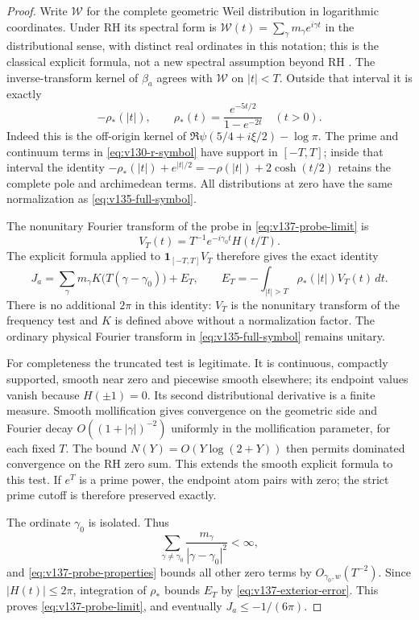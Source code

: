 \documentclass[11pt]{article}
\theoremstyle{remark}
\begin{document}
\begin{proof}
Write $\mathcal W$ for the complete geometric Weil distribution in
logarithmic coordinates. Under RH its spectral form is
$\mathcal W(t)=\sum_\gamma m_\gamma e^{i\gamma t}$ in the distributional
sense, with distinct real ordinates in this notation; this is the
classical explicit formula, not a new spectral assumption beyond RH
\cite[Theorem 2.1]{BurnolExplicit2000}.
The inverse-transform kernel of $\beta_a$ agrees with $\mathcal W$
on $|t|<T$. Outside that interval it is exactly
\[
 -\rho_*(|t|),\qquad
 \rho_*(t)=\frac{e^{-5t/2}}{1-e^{-2t}}\quad(t>0).
\]
Indeed this is the off-origin kernel of
$\Re\psi(5/4+i\xi/2)-\log\pi$. The prime and continuum terms in
\eqref{eq:v130-r-symbol} have support in $[-T,T]$; inside that interval
the identity
$-\rho_*(|t|)+e^{|t|/2}=-\rho(|t|)+2\cosh(t/2)$
retains the complete pole and archimedean terms. All distributions at
zero have the same normalization as \eqref{eq:v135-full-symbol}.

The nonunitary Fourier transform of the probe in \eqref{eq:v137-probe-limit}
is
\[
 V_T(t)=T^{-1}e^{-i\gamma_0t}H(t/T).
\]
The explicit formula applied to $\mathbf1_{[-T,T]}V_T$ therefore gives
the exact identity
\begin{equation}\label{eq:v137-zero-sum}
 J_a=\sum_\gamma m_\gamma K\bigl(T(\gamma-\gamma_0)\bigr)+E_T,
 \qquad
 E_T=-\int_{|t|>T}\rho_*(|t|)V_T(t)\,dt.
\end{equation}
There is no additional $2\pi$ in this identity: $V_T$ is the
nonunitary transform of the frequency test and $K$ is defined above
without a normalization factor. The ordinary physical Fourier transform
in \eqref{eq:v135-full-symbol} remains unitary.

For completeness the truncated test is legitimate. It is continuous,
compactly supported, smooth near zero and piecewise smooth elsewhere;
its endpoint values vanish because $H(\pm1)=0$. Its second distributional
derivative is a finite measure. Smooth mollification gives convergence
on the geometric side and Fourier decay $O((1+|\gamma|)^{-2})$
uniformly in the mollification parameter, for each fixed $T$.
The bound $N(Y)=O(Y\log(2+Y))$ then permits dominated convergence on
the RH zero sum. This extends the smooth explicit formula to this test.
If $e^T$ is a prime power, the endpoint atom pairs with zero; the strict
prime cutoff is therefore preserved exactly.

The ordinate $\gamma_0$ is isolated. Thus
\[
 \sum_{\gamma\ne\gamma_0}
       \frac{m_\gamma}{|\gamma-\gamma_0|^2}<\infty,
\]
and \eqref{eq:v137-probe-properties} bounds all other zero terms by
$O_{\gamma_0,w}(T^{-2})$. Since $|H(t)|\le2\pi$, integration of
$\rho_*$ bounds $E_T$ by \eqref{eq:v137-exterior-error}.
This proves \eqref{eq:v137-probe-limit}, and eventually
$J_a\le-1/(6\pi)$.


\end{proof}
\end{document}
